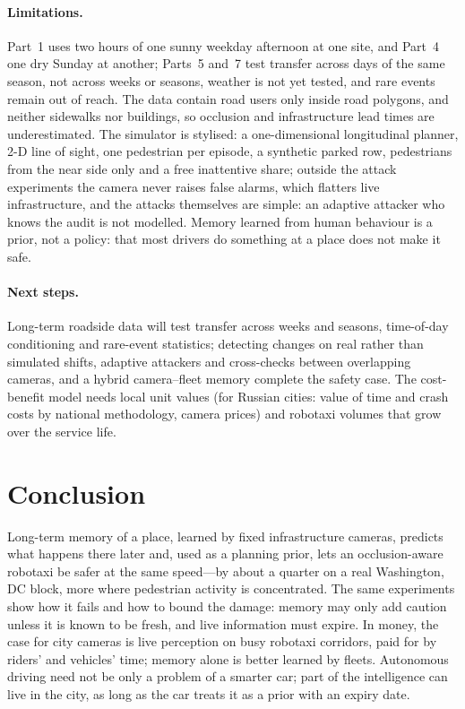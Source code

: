 \documentclass[11pt,a4paper]{article}
\begin{document}
\paragraph{Limitations.}
Part~1 uses two hours of one sunny weekday afternoon at one site, and Part~4 one dry Sunday at another; Parts~5 and~7 test transfer across days of the same season, not across weeks or seasons, weather is not yet tested, and rare events remain out of reach.
The data contain road users only inside road polygons, and neither sidewalks nor buildings, so occlusion and infrastructure lead times are underestimated.
The simulator is stylised: a one-dimensional longitudinal planner, 2-D line of sight, one pedestrian per episode, a synthetic parked row, pedestrians from the near side only and a free inattentive share; outside the attack experiments the camera never raises false alarms, which flatters live infrastructure, and the attacks themselves are simple: an adaptive attacker who knows the audit is not modelled.
Memory learned from human behaviour is a prior, not a policy: that most drivers do something at a place does not make it safe.

\paragraph{Next steps.}
Long-term roadside data \citep{yu2023v2xseq} will test transfer across weeks and seasons, time-of-day conditioning and rare-event statistics; detecting changes on real rather than simulated shifts, adaptive attackers and cross-checks between overlapping cameras, and a hybrid camera--fleet memory complete the safety case. The cost-benefit model needs local unit values (for Russian cities: value of time and crash costs by national methodology, camera prices) and robotaxi volumes that grow over the service life.

\section{Conclusion}
Long-term memory of a place, learned by fixed infrastructure cameras, predicts what happens there later and, used as a planning prior, lets an occlusion-aware robotaxi be safer at the same speed---by about a quarter on a real Washington, DC block, more where pedestrian activity is concentrated.
The same experiments show how it fails and how to bound the damage: memory may only add caution unless it is known to be fresh, and live information must expire.
In money, the case for city cameras is live perception on busy robotaxi corridors, paid for by riders' and vehicles' time; memory alone is better learned by fleets.
Autonomous driving need not be only a problem of a smarter car; part of the intelligence can live in the city, as long as the car treats it as a prior with an expiry date.
\end{document}
